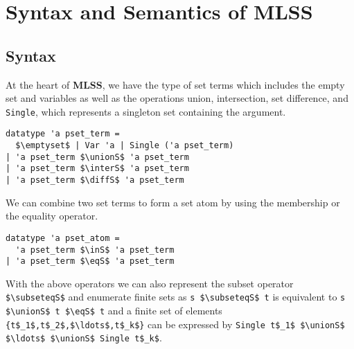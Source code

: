 \documentclass[sigplan,10pt,anonymous,review]{acmart}
\newcommand{\unionS}{\sqcup_\text{s}}
\newcommand{\interS}{\sqcap_\text{s}}
\newcommand{\diffS}{-_\text{s}}
\newcommand{\inS}{\in_\text{s}}
\newcommand{\eqS}{\approx_\text{s}}
\newcommand{\subseteqS}{\sqsubseteq_\text{s}}
\begin{document}
\section{Syntax and Semantics of MLSS\label{sec:semantics}}
\subsection{Syntax}
At the heart of \textbf{MLSS}, we have the type of set terms which includes the empty set and variables as well as the operations union, intersection, set difference, and \lstinline!Single!, which represents a singleton set containing the argument.
\begin{lstlisting}
datatype 'a pset_term =
  $\emptyset$ | Var 'a | Single ('a pset_term)
| 'a pset_term $\unionS$ 'a pset_term
| 'a pset_term $\interS$ 'a pset_term
| 'a pset_term $\diffS$ 'a pset_term
\end{lstlisting}
We can combine two set terms to form a set atom by using the membership or the equality operator.
\begin{lstlisting}
datatype 'a pset_atom =
  'a pset_term $\inS$ 'a pset_term
| 'a pset_term $\eqS$ 'a pset_term
\end{lstlisting}
With the above operators we can also represent the subset operator \lstinline!$\subseteqS$! and enumerate finite sets as \lstinline!s $\subseteqS$ t! is equivalent to \lstinline!s $\unionS$ t $\eqS$ t! and a finite set of elements \lstinline!{t$_1$,t$_2$,$\ldots$,t$_k$}! can be expressed by \lstinline!Single t$_1$ $\unionS$ $\ldots$ $\unionS$ Single t$_k$!.
\end{document}
